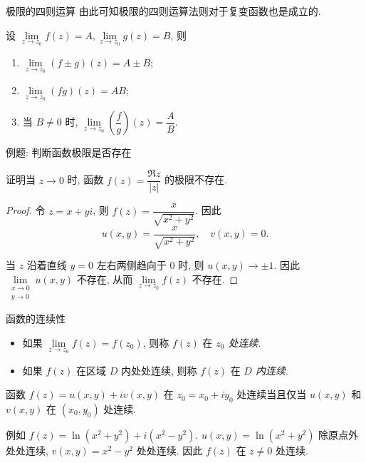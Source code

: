 \begin{frame}{极限的四则运算}
\onslide<+->
由此可知极限的四则运算法则对于复变函数也是成立的.
\begin{theorem}
设 $\lim\limits_{z\to z_0}f(z)=A,\lim\limits_{z\to z_0}g(z)=B$, 则
\begin{enumerate}
\item $\lim\limits_{z\to z_0}(f\pm g)(z)=A\pm B$;
\item $\lim\limits_{z\to z_0}(fg)(z)=AB$;
\item 当 $B\neq 0$ 时, $\lim\limits_{z\to z_0}\left(\dfrac fg\right)(z)=\dfrac AB$.
\end{enumerate}
\end{theorem}
\end{frame}


\begin{frame}{例题: 判断函数极限是否存在}
\begin{example}
证明当 $z\to0$ 时, 函数 $f(z)=\dfrac{\Re z}{|z|}$ 的极限不存在.
\end{example}
\begin{proof}
令 $z=x+yi$, 则 $f(z)=\dfrac x{\sqrt{x^2+y^2}}$.
\onslide<+->
因此
\[u(x,y)=\frac x{\sqrt{x^2+y^2}},\quad v(x,y)=0.\]

\onslide<+->
当 $z$ 沿着直线 $y=0$ 左右两侧趋向于 $0$ 时, 则 $u(x,y)\to\pm1$.
\onslide<+->
因此 $\lim\limits_{\substack{x\to 0\\y\to0}}u(x,y)$ 不存在,
\onslide<+->
从而 $\lim\limits_{z\to z_0}f(z)$ 不存在.
\end{proof}
\end{frame}


\begin{frame}{函数的连续性}
\begin{definition}
\begin{itemize}
\item 如果 $\lim\limits_{z\to z_0}f(z)=f(z_0)$, 则称 $f(z)$ 在 \emph{$z_0$ 处连续}.
\item 如果 $f(z)$ 在区域 $D$ 内处处连续, 则称 $f(z)$ 在 \emph{$D$ 内连续}.
\end{itemize}
\end{definition}

\begin{theorem}
函数 $f(z)=u(x,y)+iv(x,y)$ 在 $z_0=x_0+iy_0$ 处连续当且仅当 $u(x,y)$ 和 $v(x,y)$ 在 $(x_0,y_0)$ 处连续.
\end{theorem}

\onslide<+->
例如 $f(z)=\ln(x^2+y^2)+i(x^2-y^2)$.
\onslide<+->
$u(x,y)=\ln(x^2+y^2)$ 除原点外处处连续, $v(x,y)=x^2-y^2$ 处处连续.
\onslide<+->
因此 $f(z)$ 在 $z\neq0$ 处连续.
\end{frame}



